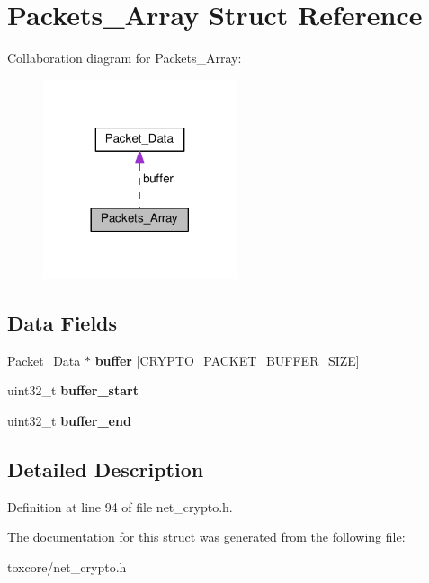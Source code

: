 \hypertarget{struct_packets___array}{\section{Packets\+\_\+\+Array Struct Reference}
\label{struct_packets___array}
}


Collaboration diagram for Packets\+\_\+\+Array\+:
\nopagebreak
\begin{figure}[H]
\begin{center}
\leavevmode
\includegraphics[width=161pt]{struct_packets___array__coll__graph}
\end{center}
\end{figure}
\subsection*{Data Fields}
\begin{DoxyCompactItemize}
\item 
\hypertarget{struct_packets___array_ae9d4e6271fdb80e86ebb3e846fcd709c}{\hyperlink{struct_packet___data}{Packet\+\_\+\+Data} $\ast$ {\bfseries buffer} \mbox{[}C\+R\+Y\+P\+T\+O\+\_\+\+P\+A\+C\+K\+E\+T\+\_\+\+B\+U\+F\+F\+E\+R\+\_\+\+S\+I\+Z\+E\mbox{]}}\label{struct_packets___array_ae9d4e6271fdb80e86ebb3e846fcd709c}

\item 
\hypertarget{struct_packets___array_a85973b335814248c05f63543876b348e}{uint32\+\_\+t {\bfseries buffer\+\_\+start}}\label{struct_packets___array_a85973b335814248c05f63543876b348e}

\item 
\hypertarget{struct_packets___array_a66d710e0093872b26ee80118c1a85d99}{uint32\+\_\+t {\bfseries buffer\+\_\+end}}\label{struct_packets___array_a66d710e0093872b26ee80118c1a85d99}

\end{DoxyCompactItemize}


\subsection{Detailed Description}


Definition at line 94 of file net\+\_\+crypto.\+h.



The documentation for this struct was generated from the following file\+:\begin{DoxyCompactItemize}
\item 
toxcore/net\+\_\+crypto.\+h\end{DoxyCompactItemize}
